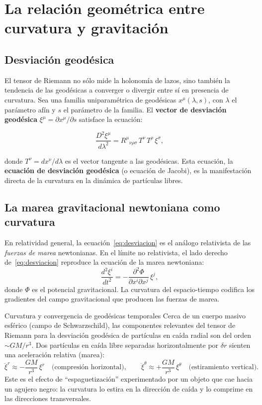 \section{La relación geométrica entre curvatura y gravitación}

\subsection{Desviación geodésica}

El tensor de Riemann no sólo mide la holonomía de lazos, sino también la tendencia de las geodésicas a converger o divergir entre sí en presencia de curvatura. Sea una familia uniparamétrica de geodésicas $x^\mu(\lambda, s)$, con $\lambda$ el parámetro afín y $s$ el parámetro de la familia. El \textbf{vector de desviación geodésica} $\xi^\mu = \partial x^\mu/\partial s$ satisface la ecuación:

\begin{equation}
  \frac{D^2\xi^\mu}{d\lambda^2} = R^\mu{}_{\nu\rho\sigma}\, T^\nu\, T^\rho\, \xi^\sigma,
  \label{eq:desviacion}
\end{equation}

donde $T^\nu = dx^\nu/d\lambda$ es el vector tangente a las geodésicas. Esta ecuación, la \textbf{ecuación de desviación geodésica} (o ecuación de Jacobi), es la manifestación directa de la curvatura en la dinámica de partículas libres.

\subsection{La marea gravitacional newtoniana como curvatura}

En relatividad general, la ecuación~\eqref{eq:desviacion} es el análogo relativista de las \emph{fuerzas de marea} newtonianas. En el límite no relativista, el lado derecho de~\eqref{eq:desviacion} reproduce la ecuación de la marea newtoniana:
\[
  \frac{d^2\xi^i}{dt^2} = -\frac{\partial^2 \Phi}{\partial x^i \partial x^j}\,\xi^j,
\]
donde $\Phi$ es el potencial gravitacional. La curvatura del espacio-tiempo codifica los gradientes del campo gravitacional que producen las fuerzas de marea.

\begin{ejemplo}{Curvatura y convergencia de geodésicas temporales}{}
Cerca de un cuerpo masivo esférico (campo de Schwarzschild), las componentes relevantes del tensor de Riemann para la desviación geodésica de partículas en caída radial son del orden $\sim GM/r^3$. Dos partículas en caída libre separadas horizontalmente por $\delta r$ sienten una aceleración relativa (marea):
\[
  \ddot{\xi}^r \approx -\frac{GM}{r^3}\,\xi^r
  \quad\text{(compresión horizontal)},
  \qquad
  \ddot{\xi}^\theta \approx +\frac{GM}{r^3}\,\xi^\theta
  \quad\text{(estiramiento vertical)}.
\]
Este es el efecto de ``espaguetización'' experimentado por un objeto que cae hacia un agujero negro: la curvatura lo estira en la dirección de caída y lo comprime en las direcciones transversales.
\end{ejemplo}

